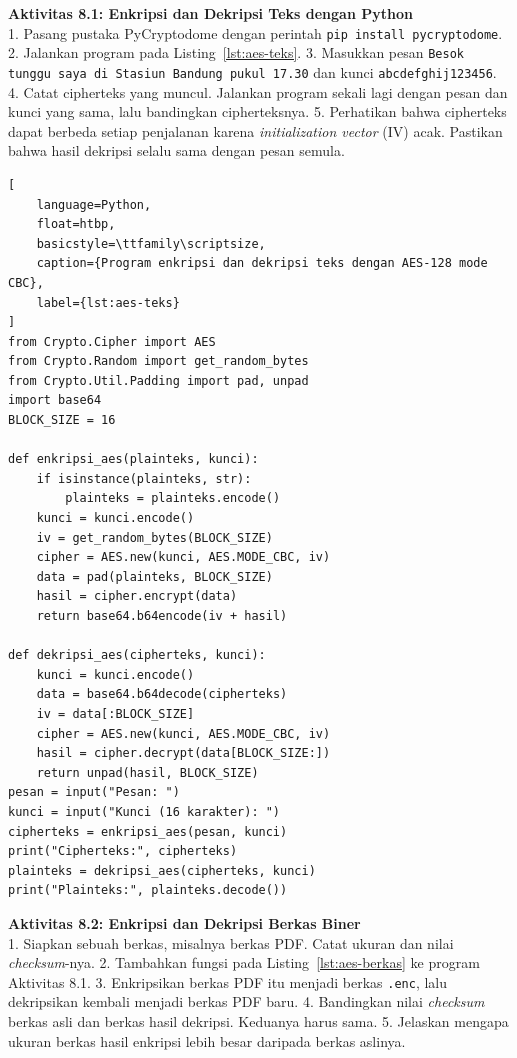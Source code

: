 \begin{obeactivity}
\textbf{Aktivitas 8.1: Enkripsi dan Dekripsi Teks dengan Python}\\
1. Pasang pustaka PyCryptodome dengan perintah \texttt{pip install pycryptodome}.
2. Jalankan program pada Listing~\ref{lst:aes-teks}.
3. Masukkan pesan \texttt{Besok tunggu saya di Stasiun Bandung pukul 17.30} dan
   kunci \texttt{abcdefghij123456}.
4. Catat cipherteks yang muncul. Jalankan program sekali lagi dengan pesan dan
   kunci yang sama, lalu bandingkan cipherteksnya.
5. Perhatikan bahwa cipherteks dapat berbeda setiap penjalanan karena
   \textit{initialization vector} (IV) acak. Pastikan bahwa hasil dekripsi
   selalu sama dengan pesan semula.
\end{obeactivity}

\begin{lstlisting}[
    language=Python,
    float=htbp,
    basicstyle=\ttfamily\scriptsize,
    caption={Program enkripsi dan dekripsi teks dengan AES-128 mode CBC},
    label={lst:aes-teks}
]
from Crypto.Cipher import AES
from Crypto.Random import get_random_bytes
from Crypto.Util.Padding import pad, unpad
import base64
BLOCK_SIZE = 16

def enkripsi_aes(plainteks, kunci):
    if isinstance(plainteks, str):
        plainteks = plainteks.encode()
    kunci = kunci.encode()
    iv = get_random_bytes(BLOCK_SIZE)
    cipher = AES.new(kunci, AES.MODE_CBC, iv)
    data = pad(plainteks, BLOCK_SIZE)
    hasil = cipher.encrypt(data)
    return base64.b64encode(iv + hasil)

def dekripsi_aes(cipherteks, kunci):
    kunci = kunci.encode()
    data = base64.b64decode(cipherteks)
    iv = data[:BLOCK_SIZE]
    cipher = AES.new(kunci, AES.MODE_CBC, iv)
    hasil = cipher.decrypt(data[BLOCK_SIZE:])
    return unpad(hasil, BLOCK_SIZE)
pesan = input("Pesan: ")
kunci = input("Kunci (16 karakter): ")
cipherteks = enkripsi_aes(pesan, kunci)
print("Cipherteks:", cipherteks)
plainteks = dekripsi_aes(cipherteks, kunci)
print("Plainteks:", plainteks.decode())
\end{lstlisting}

\begin{obeactivity}
\textbf{Aktivitas 8.2: Enkripsi dan Dekripsi Berkas Biner}\\
1. Siapkan sebuah berkas, misalnya berkas PDF. Catat ukuran dan nilai
   \textit{checksum}-nya.
2. Tambahkan fungsi pada Listing~\ref{lst:aes-berkas} ke program Aktivitas 8.1.
3. Enkripsikan berkas PDF itu menjadi berkas \texttt{.enc}, lalu dekripsikan
   kembali menjadi berkas PDF baru.
4. Bandingkan nilai \textit{checksum} berkas asli dan berkas hasil dekripsi.
   Keduanya harus sama.
5. Jelaskan mengapa ukuran berkas hasil enkripsi lebih besar daripada berkas
   aslinya.
\end{obeactivity}


